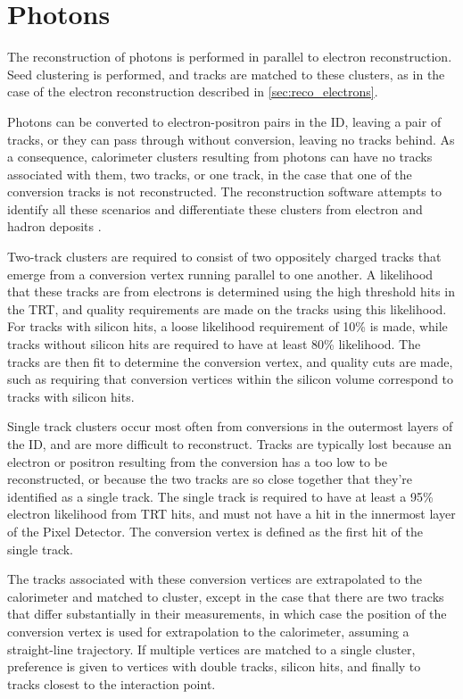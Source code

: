\section{Photons}
\label{sec:reco_photons}

The reconstruction of photons is performed in parallel to electron reconstruction. Seed clustering is performed, and tracks are matched to these clusters, as in the case of the electron reconstruction described in \autoref{sec:reco_electrons}. 

Photons can be converted to electron-positron pairs in the \ac{ID}, leaving a pair of tracks, or they can pass through without conversion, leaving no tracks behind. As a consequence, calorimeter clusters resulting from photons can have no tracks associated with them, two tracks, or one track, in the case that one of the conversion tracks is not reconstructed. The reconstruction software attempts to identify all these scenarios and differentiate these clusters from electron and hadron deposits \cite{1606.01813}.

Two-track clusters are required to consist of two oppositely charged tracks that emerge from a conversion vertex running parallel to one another. A likelihood that these tracks are from electrons is determined using the high threshold hits in the \ac{TRT}, and quality requirements are made on the tracks using this likelihood. For tracks with silicon hits, a loose likelihood requirement of 10\% is made, while tracks without silicon hits are required to have at least 80\% likelihood. The tracks are then fit to determine the conversion vertex, and quality cuts are made, such as requiring that conversion vertices within the silicon volume correspond to tracks with silicon hits. 

Single track clusters occur most often from conversions in the outermost layers of the \ac{ID}, and are more difficult to reconstruct. Tracks are typically lost because an electron or positron resulting from the conversion has a \pt too low to be reconstructed, or because the two tracks are so close together that they're identified as a single track. The single track is required to have at least a 95\% electron likelihood from \ac{TRT} hits, and must not have a hit in the innermost layer of the Pixel Detector. The conversion vertex is defined as the first hit of the single track. 

The tracks associated with these conversion vertices are extrapolated to the calorimeter and matched to cluster, except in the case that there are two tracks that differ substantially in their \pt measurements, in which case the position of the conversion vertex is used for extrapolation to the calorimeter, assuming a straight-line trajectory. If multiple vertices are matched to a single cluster, preference is given to vertices with double tracks, silicon hits, and finally to tracks closest to the interaction point. 

